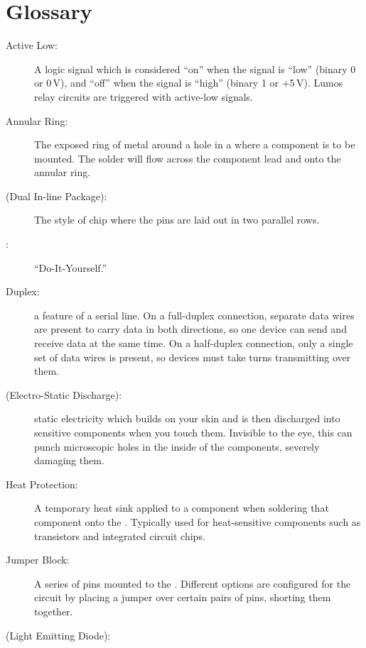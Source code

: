 \documentclass[letterpaper,twoside,onecolumn,openright,final]{memoir}
\begin{document}
\chapter{Glossary}\label{ch:glossary}
\begin{description}
	\item[Active Low:]
		A logic signal which is considered ``on'' when the signal is ``low'' (binary 0 or 0\,V),
		and ``off'' when the signal is ``high'' (binary 1 or +5\,V).  Lumos relay circuits are 
		triggered with active-low signals.
	\item[Annular Ring:]
		The exposed ring of metal around a hole in a  where a component is to be 
		mounted.  The solder will flow across the component lead and onto the annular ring.
	\item[ (Dual In-line Package):]
		The style of chip where the pins are laid out in two parallel rows.
	\item[:] ``Do-It-Yourself.''
	\item[Duplex:]
		a feature of a serial line.  On a full-duplex connection, separate data wires are present
		to carry data in both directions, so one device can send and receive data at the same time.
		On a half-duplex connection, only a single set of data wires is present, so devices must
		take turns transmitting over them.
	\item[ (Electro-Static Discharge):]
		static electricity which builds on your skin and is then discharged into sensitive
		components when you touch them.  Invisible to the eye, this can punch microscopic holes
		in the inside of the components, severely damaging them.
	\item[Heat Protection:]
		A temporary heat sink applied to a component when soldering that component onto
		the .  Typically used for heat-sens\-i\-tive components such as transistors
		and integrated circuit chips.
	\item[Jumper Block:]
		A series of pins mounted to the .  Different options are configured for the
		circuit by placing a jumper over certain pairs of pins, shorting them together.
	\item[ (Light Emitting Diode):]

\end{description}
\end{document}
